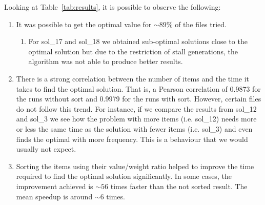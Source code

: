 \documentclass[anon]{CI}
\begin{document}
Looking at Table~\ref{tab:results}, it is possible to observe the following:
\begin{enumerate}
    \item It was possible to get the optimal value for $\sim89\%$ of the files tried.
    \begin{enumerate}
        \item For sol\_17 and sol\_18 we obtained sub-optimal solutions close to the optimal solution but due to the restriction of stall generations, the algorithm was not able to produce better results.
    \end{enumerate}
    
    \item There is a strong correlation between the number of items and the time it takes to find the optimal solution. That is, a Pearson correlation of 0.9873 for the runs without sort and 0.9979 for the runs with sort. However, certain files do not follow this trend. For instance, if we compare the results from sol\_12 and sol\_3 we see how the problem with more items (i.e. sol\_12) needs more or less the same time as the solution with fewer items (i.e. sol\_3) and even finds the optimal with more frequency. This is a behaviour that we would usually not expect.
    
    \item Sorting the items using their value/weight ratio helped to improve the time required to find the optimal solution significantly. In some cases, the improvement achieved is $\sim56$ times faster than the not sorted result. The mean speedup is around $\sim6$ times.
\end{enumerate}
\end{document}
